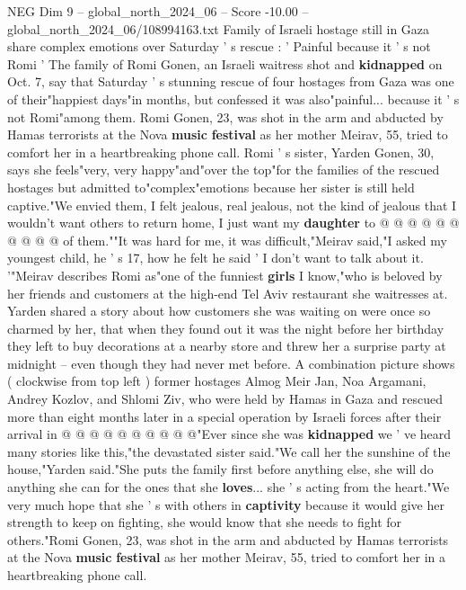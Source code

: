 \begin{textsample}{NEG Dim 9 – global\_north\_2024\_06 – Score -10.00 – global\_north\_2024\_06/108994163.txt}  \label{ex:f9_neg_161}
Family of Israeli hostage still in Gaza share complex emotions over Saturday ' s rescue : ' Painful because it ' s not Romi ' The family of Romi Gonen, an Israeli waitress shot and \textbf{kidnapped} on Oct. 7, say that Saturday ' s stunning rescue of four hostages from Gaza was one of their"happiest days"in months, but confessed it was also"painful... because it ' s not Romi"among them.
Romi Gonen, 23, was shot in the arm and abducted by Hamas terrorists at the Nova \textbf{music} \textbf{festival} as her mother Meirav, 55, tried to comfort her in a heartbreaking phone call.
Romi ' s sister, Yarden Gonen, 30, says she feels"very, very happy"and"over the top"for the families of the rescued hostages but admitted to"complex"emotions because her sister is still held captive."We envied them, I felt jealous, real jealous, not the kind of jealous that I wouldn't want others to return home, I just want my \textbf{daughter} to @ @ @ @ @ @ @ @ @ @ of them.""It was hard for me, it was difficult,"Meirav said,"I asked my youngest child, he ' s 17, how he felt he said ' I don't want to talk about it. '"Meirav describes Romi as"one of the funniest \textbf{girls} I know,"who is beloved by her friends and customers at the high-end Tel Aviv restaurant she waitresses at.
Yarden shared a story about how customers she was waiting on were once so charmed by her, that when they found out it was the night before her birthday they left to buy decorations at a nearby store and threw her a surprise party at midnight -- even though they had never met before.
A combination picture shows ( clockwise from top left ) former hostages Almog Meir Jan, Noa Argamani, Andrey Kozlov, and Shlomi Ziv, who were held by Hamas in Gaza and rescued more than eight months later in a special operation by Israeli forces after their arrival in @ @ @ @ @ @ @ @ @ @"Ever since she was \textbf{kidnapped} we ' ve heard many stories like this,"the devastated sister said."We call her the sunshine of the house,"Yarden said."She puts the family first before anything else, she will do anything she can for the ones that she \textbf{loves}... she ' s acting from the heart."We very much hope that she ' s with others in \textbf{captivity} because it would give her strength to keep on fighting, she would know that she needs to fight for others."Romi Gonen, 23, was shot in the arm and abducted by Hamas terrorists at the Nova \textbf{music} \textbf{festival} as her mother Meirav, 55, tried to comfort her in a heartbreaking phone call.

\end{textsample}
